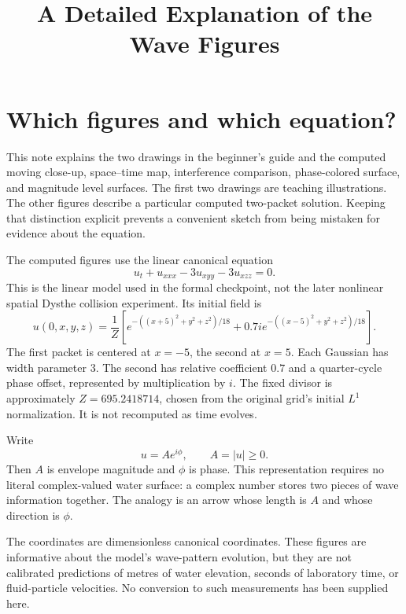 \documentclass[10pt]{article}
\title{A Detailed Explanation of the Wave Figures}
\author{}
\date{}
\begin{document}
\maketitle

\section{Which figures and which equation?}
This note explains the two drawings in the beginner's guide and the computed moving close-up, space--time map, interference comparison, phase-colored surface, and magnitude level surfaces. The first two drawings are teaching illustrations. The other figures describe a particular computed two-packet solution. Keeping that distinction explicit prevents a convenient sketch from being mistaken for evidence about the equation.

The computed figures use the linear canonical equation
\begin{equation}
 u_t+u_{xxx}-3u_{xyy}-3u_{xzz}=0.
 \label{eq:pde}
\end{equation}
This is the linear model used in the formal checkpoint, not the later nonlinear spatial Dysthe collision experiment. Its initial field is
\begin{equation}
 u(0,x,y,z)=\frac{1}{Z}\left[
 e^{-((x+5)^2+y^2+z^2)/18}
 +0.7i e^{-((x-5)^2+y^2+z^2)/18}\right].
 \label{eq:initial}
\end{equation}
The first packet is centered at $x=-5$, the second at $x=5$. Each Gaussian has width parameter $3$. The second has relative coefficient $0.7$ and a quarter-cycle phase offset, represented by multiplication by $i$. The fixed divisor is approximately $Z=695.2418714$, chosen from the original grid's initial $L^1$ normalization. It is not recomputed as time evolves.

Write
\begin{equation}
 u=Ae^{i\phi},\qquad A=|u|\geq0.
 \label{eq:polar}
\end{equation}
Then $A$ is envelope magnitude and $\phi$ is phase. This representation requires no literal complex-valued water surface: a complex number stores two pieces of wave information together. The analogy is an arrow whose length is $A$ and whose direction is $\phi$.

The coordinates are dimensionless canonical coordinates. These figures are informative about the model's wave-pattern evolution, but they are not calibrated predictions of metres of water elevation, seconds of laboratory time, or fluid-particle velocities. No conversion to such measurements has been supplied here.
\end{document}
